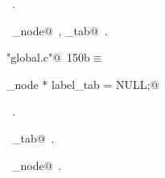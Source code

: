 \documentclass[a4paper]{report}
\begin{document}
\begin{flushleft}
\begin{minipage}{\linewidth}
\begin{list}{}{}
\mbox{}\verb@}@\\
\mbox{}\verb@@{\NWsep}
\end{list}
\vspace{-1.5ex}
\footnotesize
\begin{list}{}{\setlength{\itemsep}{-\parsep}\setlength{\itemindent}{-\leftmargin}}
\item \NWtxtMacroRefIn\ .
\item \NWtxtIdentsUsed\nobreak\  \verb@label_node@\nobreak\ , \verb@label_tab@\nobreak\ .
\item{}
\end{list}
\end{minipage}\vspace{4ex}
\end{flushleft}
\begin{flushleft} \small
\begin{minipage}{\linewidth}\label{scrap334}\raggedright\small
{} \verb@"global.c"@\nobreak\ {\footnotesize {150b}}$\equiv$
\vspace{-1ex}
\begin{list}{}{} \item
\mbox{}\verb@label_node * label_tab = NULL;@\\
\mbox{}\verb@@{\NWsep}
\end{list}
\vspace{-1.5ex}
\footnotesize
\begin{list}{}{\setlength{\itemsep}{-\parsep}\setlength{\itemindent}{-\leftmargin}}
\item \NWtxtFileDefBy\ .
\item \NWtxtIdentsDefed\nobreak\  \verb@label_tab@\nobreak\ .\item \NWtxtIdentsUsed\nobreak\  \verb@label_node@\nobreak\ .
\item{}
\end{list}
\end{minipage}\vspace{4ex}
\end{flushleft}
\end{document}

